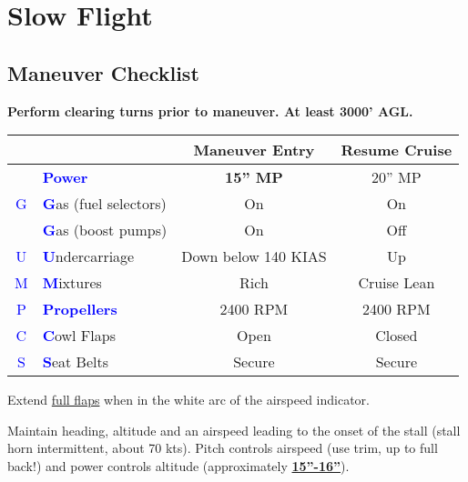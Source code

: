 {\newpage

\section{Slow Flight}
\subsection{Maneuver Checklist}

\textbf{Perform clearing turns prior to maneuver. At least 3000' AGL.}

\begin{table}[H]
\centering
\begin{tabular}{|c|l|c|c|}
\hline
                    &                                                 & \textbf{Maneuver Entry} & \textbf{Resume Cruise} \\ \hline
                    & \textcolor{blue}{\textbf{Power}}                & \textbf{15'' MP}        & 20'' MP                \\ \hline
\textcolor{blue}{G} & \textcolor{blue}{\textbf{G}}as (fuel selectors) & On                      & On                     \\
                    & \textcolor{blue}{\textbf{G}}as (boost pumps)    & On                      & Off                    \\ \hline
\textcolor{blue}{U} & \textcolor{blue}{\textbf{U}}ndercarriage        & Down below 140 KIAS     & Up                     \\ \hline
\textcolor{blue}{M} & \textcolor{blue}{\textbf{M}}ixtures             & Rich                    & Cruise Lean            \\ \hline
\textcolor{blue}{P} & \textcolor{blue}{\textbf{Propellers}}           & 2400 RPM                & 2400 RPM               \\ \hline
\textcolor{blue}{C} & \textcolor{blue}{\textbf{C}}owl Flaps           & Open                    & Closed                 \\ \hline
\textcolor{blue}{S} & \textcolor{blue}{\textbf{S}}eat Belts           & Secure                  & Secure                 \\ \hline
\end{tabular}
\end{table}

Extend \underline{full flaps} when in the white arc of the airspeed indicator.

Maintain heading, altitude and an airspeed leading to the onset of the stall (stall horn intermittent, about 70 kts).
Pitch controls airspeed (use trim, up to full back!) and power controls altitude (approximately \underline{\textbf{15''-16''}}).

}

